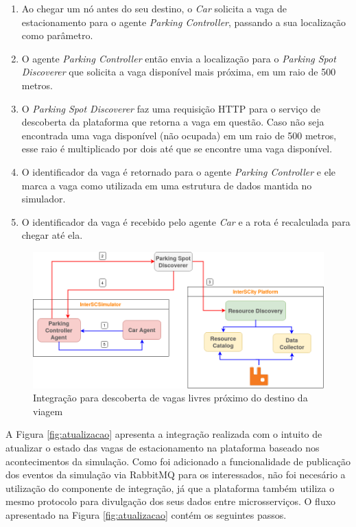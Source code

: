 \begin{enumerate}
    \item Ao chegar um nó antes do seu destino, o \textit{Car} solicita a vaga de estacionamento para o agente \textit{Parking Controller}, passando a sua
	localização como parâmetro.

	\item O agente \textit{Parking Controller} então envia a localização para o \textit{Parking Spot Discoverer} que solicita a vaga disponível mais próxima,
	em um raio de 500 metros.

	\item O \textit{Parking Spot Discoverer} faz uma requisição HTTP para o serviço de descoberta da plataforma que retorna a vaga em questão.
	Caso não seja encontrada uma vaga disponível (não ocupada) em um raio de 500 metros, esse raio é multiplicado por dois até que se encontre uma vaga
	disponível.

	\item O identificador da vaga é retornado para o agente \textit{Parking Controller} e ele marca a vaga como utilizada em uma estrutura de dados mantida no simulador.

    \item O identificador da vaga é recebido pelo agente \textit{Car} e a rota é recalculada para chegar até ela.
\end{enumerate}

\begin{figure}[ht]
	\centering
	\includegraphics[width=\textwidth]{figuras/integration_get_data_smart_parking.png}
	\caption{Integração para descoberta de vagas livres próximo do destino da
	viagem}
	\label{fig:descoberta}
\end{figure}

A Figura \ref{fig:atualizacao} apresenta a integração realizada com o intuito de atualizar o estado das vagas de estacionamento na plataforma baseado nos
acontecimentos da simulação.
Como foi adicionado a funcionalidade de publicação dos eventos da simulação via RabbitMQ para os interessados, não foi necesário a utilização do
componente de integração, já que a plataforma também utiliza o mesmo protocolo para divulgação dos seus dados entre microsserviços.
O fluxo apresentado na Figura \ref{fig:atualizacao} contém os seguintes passos.


